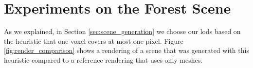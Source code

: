\section{Experiments on the Forest Scene}
\label{sec:forest}
As we explained, in Section \ref{sec:scene_generation} we choose our \acsp{lod} based on the heuristic that one voxel covers at most one pixel.
Figure \ref{fig:render_comparison} shows a rendering of a scene that was generated with this heuristic compared to a reference rendering that uses only meshes.
\begin{figure}[t]
    \centering
    \begin{subfigure}[b]{\linewidth}
\end{subfigure}
\end{figure}
